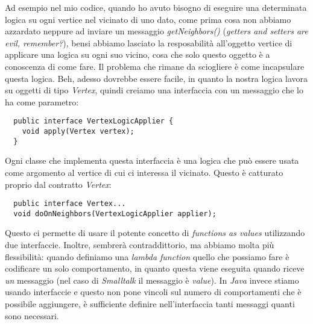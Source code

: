 Ad esempio nel mio codice, quando ho avuto bisogno di eseguire una
determinata logica su ogni vertice nel vicinato di uno dato, come
prima cosa non abbiamo azzardato neppure ad inviare un messaggio
\emph{getNeighbors()} (\emph{getters and setters are evil,
  remember?}), bensi abbiamo lasciato la resposabilit\`a all'oggetto
vertice di applicare una logica su ogni suo vicino, cosa che solo
questo oggetto \`e a conoscenza di come fare. Il problema che rimane
da sciogliere \`e come incapsulare questa logica. Beh, adesso dovrebbe
essere facile, in quanto la nostra logica lavora su oggetti di tipo
\emph{Vertex}, quindi creiamo una interfaccia con un messaggio che lo
ha come parametro:
\begin{lstlisting}
  public interface VertexLogicApplier {
    void apply(Vertex vertex);
  }
\end{lstlisting}
Ogni classe che implementa questa interfaccia \`e una logica che pu\`o
essere usata come argomento al vertice di cui ci interessa il
vicinato. Questo \`e catturato proprio dal contratto \emph{Vertex}:
\begin{lstlisting}
  public interface Vertex...
  void doOnNeighbors(VertexLogicApplier applier);
\end{lstlisting}
Questo ci permette di usare il potente concetto di \emph{functions as
  values} utilizzando due interfaccie. Inoltre, sembrer\`a
contraddittorio, ma abbiamo molta pi\`u flessibilit\`a: quando
definiamo una \emph{lambda function} quello che possiamo fare \`e
codificare un solo comportamento, in quanto questa viene eseguita
quando riceve \emph{un} messaggio (nel caso di \emph{Smalltalk} il
messaggio \`e \emph{value}). In \emph{Java} invece stiamo usando
interfaccie e questo non pone vincoli sul numero di comportamenti che
\`e possibile aggiungere, \`e sufficiente definire nell'interfaccia
tanti messaggi quanti sono necessari.
